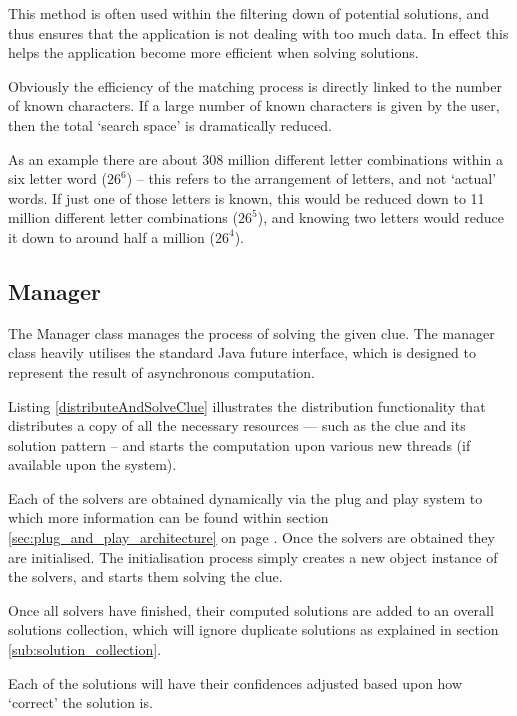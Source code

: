 This method is often used within the filtering down of potential solutions, and
thus ensures that the application is not dealing with too much data. In effect
this helps the application become more efficient when solving solutions. 

Obviously the efficiency of the matching process is directly linked to the 
number of known characters. If a large number of known characters is given by the
user, then the total `search space' is dramatically reduced.

As an example there are about 308 million different letter combinations within a
six letter word ($26^6$) -- this refers to the arrangement of letters, and not 
`actual' words. If just one of those letters is known, this would be reduced 
down to 11 million different letter combinations ($26^5$), and knowing two 
letters would reduce it down to around half a million ($26^4$).


\subsection{Manager}
\label{sub:manager}

The Manager class manages the process of solving the given clue. The manager 
class heavily utilises the standard Java future interface, which is designed to
represent the result of asynchronous computation.

Listing \ref{distributeAndSolveClue} illustrates the distribution functionality 
that distributes a copy of all the necessary resources --- such as the clue 
and its solution pattern -- and starts the computation upon various new 
threads (if available upon the system).

Each of the solvers are obtained dynamically via the plug and play system to 
which more information can be found within section 
\ref{sec:plug_and_play_architecture} on page \pageref{sec:plug_and_play_architecture}.
Once the solvers are obtained they are initialised. The initialisation process
simply creates a new object instance of the solvers, and starts them solving the
clue.

Once all solvers have finished, their computed solutions are added to an overall
solutions collection, which will ignore duplicate solutions as explained in 
section \ref{sub:solution_collection}.

Each of the solutions will have their confidences adjusted based upon how 
`correct' the solution is.

